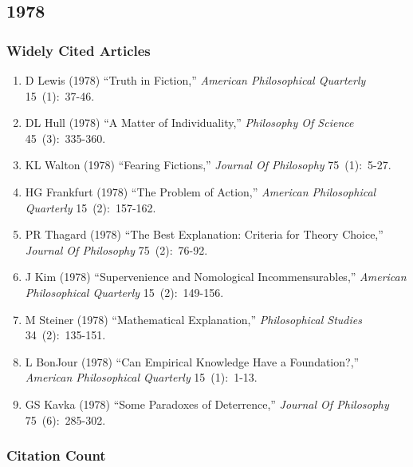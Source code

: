 \documentclass[
  10pt,
  letterpaper,
  DIV=11,
  numbers=noendperiod,
  twoside]{scrartcl}
\providecommand{\tightlist}{%
  \setlength{\itemsep}{0pt}\setlength{\parskip}{0pt}}\usepackage{longtable,booktabs,array}
\begin{document}
\newpage

\subsection{1978}\label{sec-s1978}

\subsubsection*{Widely Cited Articles}\label{widely-cited-articles-21}

\begin{enumerate}
\def\labelenumi{\arabic{enumi}.}
\tightlist
\item
  D Lewis (1978) ``Truth in Fiction,'' \emph{American Philosophical
  Quarterly} 15~(1):~37-46.
\item
  DL Hull (1978) ``A Matter of Individuality,'' \emph{Philosophy Of
  Science} 45~(3):~335-360.
\item
  KL Walton (1978) ``Fearing Fictions,'' \emph{Journal Of Philosophy}
  75~(1):~5-27.
\item
  HG Frankfurt (1978) ``The Problem of Action,'' \emph{American
  Philosophical Quarterly} 15~(2):~157-162.
\item
  PR Thagard (1978) ``The Best Explanation: Criteria for Theory
  Choice,'' \emph{Journal Of Philosophy} 75~(2):~76-92.
\item
  J Kim (1978) ``Supervenience and Nomological Incommensurables,''
  \emph{American Philosophical Quarterly} 15~(2):~149-156.
\item
  M Steiner (1978) ``Mathematical Explanation,'' \emph{Philosophical
  Studies} 34~(2):~135-151.
\item
  L BonJour (1978) ``Can Empirical Knowledge Have a Foundation?,''
  \emph{American Philosophical Quarterly} 15~(1):~1-13.
\item
  GS Kavka (1978) ``Some Paradoxes of Deterrence,'' \emph{Journal Of
  Philosophy} 75~(6):~285-302.
\end{enumerate}

\subsubsection*{Citation Count}\label{sec-count-1978}
\end{document}

